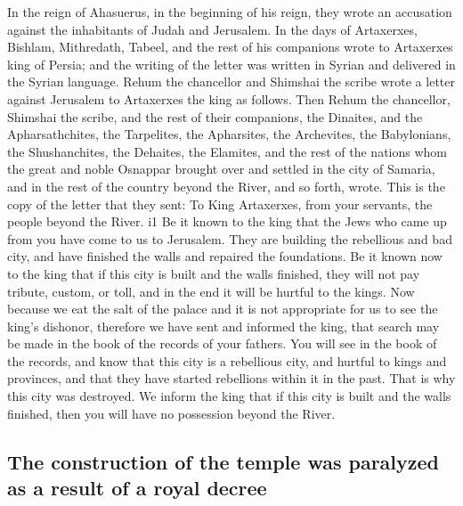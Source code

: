  In the reign of Ahasuerus, in the beginning of his reign,
they wrote an accusation against the inhabitants of Judah and Jerusalem.
 In the days of Artaxerxes, Bishlam, Mithredath, Tabeel,
and the rest of his companions wrote to Artaxerxes king of Persia; and
the writing of the letter was written in Syrian and delivered in the
Syrian language.  Rehum the chancellor and Shimshai the
scribe wrote a letter against Jerusalem to Artaxerxes the king as
follows.  Then Rehum the chancellor, Shimshai the scribe,
and the rest of their companions, the Dinaites, and the Apharsathchites,
the Tarpelites, the Apharsites, the Archevites, the Babylonians, the
Shushanchites, the Dehaites, the Elamites,  and the rest
of the nations whom the great and noble Osnappar brought over and
settled in the city of Samaria, and in the rest of the country beyond
the River, and so forth, wrote.  This is the copy of the
letter that they sent: To King Artaxerxes, from your servants, the
people beyond the River. i1  Be it known to the king that
the Jews who came up from you have come to us to Jerusalem. They are
building the rebellious and bad city, and have finished the walls and
repaired the foundations.  Be it known now to the king
that if this city is built and the walls finished, they will not pay
tribute, custom, or toll, and in the end it will be hurtful to the
kings.  Now because we eat the salt of the palace and it
is not appropriate for us to see the king's dishonor, therefore we have
sent and informed the king,  that search may be made in
the book of the records of your fathers. You will see in the book of the
records, and know that this city is a rebellious city, and hurtful to
kings and provinces, and that they have started rebellions within it in
the past. That is why this city was destroyed.  We inform
the king that if this city is built and the walls finished, then you
will have no possession beyond the River.

\hypertarget{the-construction-of-the-temple-was-paralyzed-as-a-result-of-a-royal-decree}{%
\subsection{The construction of the temple was paralyzed as a result of
a royal
decree}\label{the-construction-of-the-temple-was-paralyzed-as-a-result-of-a-royal-decree}}

